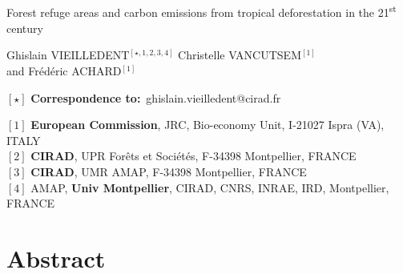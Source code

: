 \documentclass[
  12pt,
]{article}
\author{}
\date{}
\begin{document}
\renewcommand{\bibsection}{}  %
~
\vspace{-0.25cm}
\begin{center}
  \LARGE{Forest refuge areas and carbon emissions from tropical deforestation in the 21\textsuperscript{st} century}
\end{center}

\vspace{0.5cm}

\begin{center}
  \large{
  Ghislain VIEILLEDENT$^{[\star, 1, 2, 3, 4]}$ \hspace{0.5cm} Christelle VANCUTSEM$^{[1]}$\\
  \vspace{0.5cm}
  and \hspace{0.5cm} Frédéric ACHARD$^{[1]}$
  }
\end{center}

\vspace{0.5cm}

\begin{center}
  $[\star]$ \textbf{Correspondence to:}~ghislain.vieilledent@cirad.fr\\
\end{center}

\vspace{0.5cm}

{\small
  \begin{flushleft}
    $[1]$ \textbf{European Commission}, JRC, Bio-economy Unit, I-21027 Ispra (VA), ITALY\\
    $[2]$ \textbf{CIRAD}, UPR Forêts et Sociétés, F-34398 Montpellier, FRANCE\\
    $[3]$ \textbf{CIRAD}, UMR AMAP, F-34398 Montpellier, FRANCE\\
    $[4]$ AMAP, \textbf{Univ Montpellier}, CIRAD, CNRS, INRAE, IRD, Montpellier, FRANCE\\
  \end{flushleft}}


\linenumbers

\hypertarget{abstract}{%
\section*{Abstract}\label{abstract}}
\end{document}
